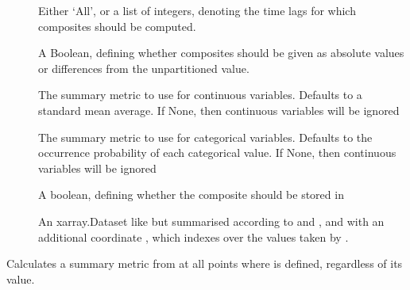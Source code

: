 \documentclass[letterpaper,10pt,english]{sphinxmanual}
\begin{document}
\begin{fulllineitems}
\begin{fulllineitems}
\begin{description}
\item[{}] \leavevmode
\sphinxAtStartPar
Either ‘All’, or a list of integers, denoting the time lags for which composites should be computed.

\item[{}] \leavevmode
\sphinxAtStartPar
A Boolean, defining whether composites should be given as absolute values or differences from the unpartitioned value.

\item[{}] \leavevmode
\sphinxAtStartPar
The summary metric to use for continuous variables. Defaults to a standard mean average. If None, then continuous variables will be ignored

\item[{}] \leavevmode
\sphinxAtStartPar
The summary metric to use for categorical variables. Defaults to the occurrence probability of each categorical value. If None, then continuous variables will be ignored

\item[{}] \leavevmode
\sphinxAtStartPar
A boolean, defining whether the composite should be stored in 

\item[{}] \leavevmode
\sphinxAtStartPar
An xarray.Dataset like   but summarised according to  and , and with an additional coordinate , which indexes over the values taken by .

\end{description}

\end{fulllineitems}


\begin{fulllineitems}
\label{\detokenize{docs/composites:composites.LaggedAnalyser.aggregate_variables}}
\pysigstartsignatures
{}
\pysigstopsignatures
\sphinxAtStartPar
Calculates a summary metric from  at all points where  is defined, regardless of its value.


\end{fulllineitems}
\end{fulllineitems}
\end{document}
